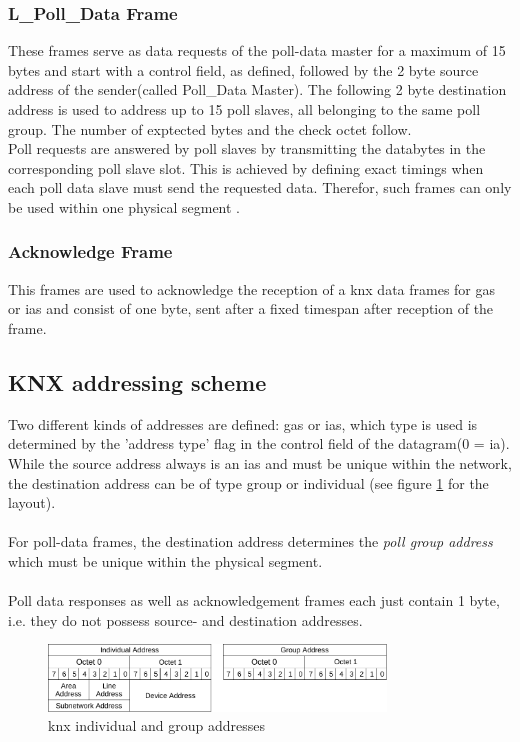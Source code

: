 \subsubsection{L\_Poll\_Data Frame}

These frames serve as data requests of the poll-data master for a maximum of 15 bytes
and start with a control field, as defined, followed by the 2 byte source address
of the sender(called Poll\_Data Master). The following 2 byte destination address is 
used to address up to 15 poll slaves, all belonging to the same poll group. The number of
exptected bytes and the check octet follow.
\\
Poll requests are answered by poll slaves by transmitting the databytes in the corresponding poll slave slot.
This is achieved by defining exact timings when each poll data slave must send the requested data. Therefor, such frames can only be used within
one physical segment \cite{knxTP1}.

\subsubsection{Acknowledge Frame}

This frames are used to acknowledge the reception of a knx data frames for \glspl{ga} or \glspl{ia} and consist
of one byte, sent after a fixed timespan after reception of the frame.

\subsection{KNX addressing scheme}

Two different kinds of addresses are defined: \glspl{ga} or \glspl{ia}, which type is used is determined by the 'address type' flag in the
control field of the datagram(0 = \gls{ia}). While the source address always is an \glspl{ia} and must be unique
within the network, the destination address can be of type group or individual (see figure \ref{fig:knxAddr} for the layout).
\\
\\
For poll-data frames, the destination address determines the \textit{poll group address} which must be unique within the physical segment.
\\
\\
Poll data responses as well as acknowledgement frames each just contain 1 byte, i.e. they do not possess source- and destination addresses.

\begin{figure}
 \centering
    \includegraphics[width=0.8\textwidth]{figures/addresses}
 \caption{\gls{knx} individual and group addresses} 
\label{fig:knxAddr}
\end{figure}


